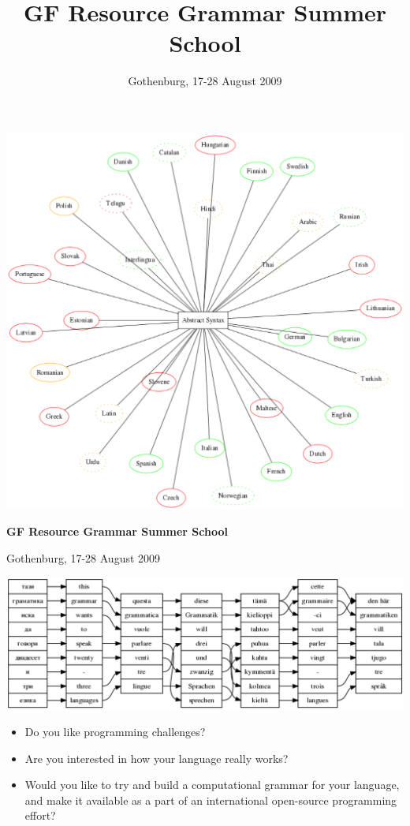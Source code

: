 \documentclass[12pt]{article}
\title{GF Resource Grammar Summer School}
\author{Gothenburg, 17-28 August 2009}
\begin{document}
\begin{center}
\includegraphics{summer-langs.png}

\vspace{6mm}

{\Large\bf GF Resource Grammar Summer School}

\vspace{2mm}

Gothenburg, 17-28 August 2009

\vspace{6mm}

\includegraphics{summer-align.png}
\end{center}

\newpage

\begin{itemize}
\item Do you like programming challenges? 
\item Are you interested in how your language really works? 
\item Would you like to try and build a computational grammar for your language, 
  and make it available as a part of an international open-source 
  programming effort? 
\end{itemize}
\end{document}
